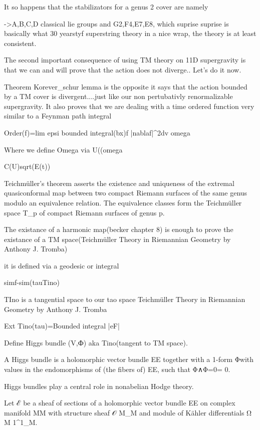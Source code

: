 It so happens that the stabilizators for a genus 2 cover are namely

->A,B,C,D classical lie groups and G2,F4,E7,E8, which suprise suprise is basically what 30 yearstyf superstring theory in a nice wrap,
the theory is at least consistent.

The second important consequence of using TM theory on 11D supergravity is that we can and will prove that the action does not diverge.. Let's do it now.

Theorem Korever_schur lemma is the opposite it says that the action bounded by a TM cover is divergent....just like our non pertubativly 
renormalizable supergravity.
 It also proves that we are dealing with a time ordered function very similar to a Feynman path integral

Order(f)=lim epsi bounded integral(bx)f |nablaf|^2dv omega

Where we define Omega via U((omega 

C(U)sqrt(E(t))



Teichmüller's theorem asserts the existence and uniqueness of the extremal quasiconformal map between two compact Riemann surfaces of the same genus 
modulo an equivalence relation. The equivalence classes form the Teichmüller space T_p of compact Riemann surfaces of genus p. 

The existance of a harmonic map(becker chapter 8) is enough to prove the existance of a TM space(Teichmüller Theory in Riemannian Geometry by Anthony J. Tromba)

it is defined via a geodesic or integral

simf-sim(tauTino)

TIno is a tangential space to our tao space Teichmüller Theory in Riemannian Geometry by Anthony J. Tromba

Ext Tino(tau)=Bounded integral |eF|

Define Higgs bundle (V,Ф) aka Tino(tangent to TM space).

A Higgs bundle is a holomorphic vector bundle EE together with a 1-form Φ\Phi with values in the endomorphisms of (the fibers of) EE, such that Φ∧Φ=0\Phi \wedge \Phi = 0.

Higgs bundles play a central role in nonabelian Hodge theory.

Let ℰ be a sheaf of sections of a holomorphic vector bundle EE on complex manifold MM with structure sheaf 𝒪 M_M and module of Kähler differentials Ω M 1\Omega^1_M.


